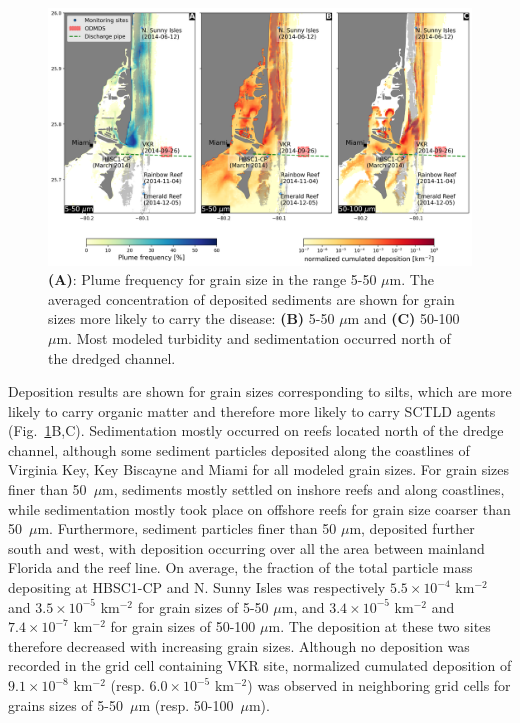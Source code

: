 \documentclass[preprint,12pt,authoryear]{elsarticle}
\begin{document}
\begin{figure}
	\centering
	\includegraphics[width=\textwidth]{figures/fig2_stokes4.png}
	\caption{\textbf{(A)}: Plume frequency for grain size in the range 5-50 $\mu$m. The averaged concentration of deposited sediments are shown for grain sizes more likely to carry the disease: \textbf{(B)} 5-50 $\mu$m and \textbf{(C)} 50-100 $\mu$m. Most modeled turbidity and sedimentation occurred north of the dredged channel.}
	\label{fig:onset_depo}
\end{figure}

Deposition results are shown for grain sizes corresponding to silts, which are more likely to carry organic matter and therefore more likely to carry SCTLD agents \citep{erftemeijer2012environmental}(Fig.~\ref{fig:onset_depo}B,C). Sedimentation mostly occurred on reefs located north of the dredge channel, although some sediment particles deposited along the coastlines of Virginia Key, Key Biscayne and Miami for all modeled grain sizes. For grain sizes finer than 50~$\mu$m, sediments mostly settled on inshore reefs and along coastlines, while sedimentation mostly took place on offshore reefs for grain size coarser than 50~$\mu$m. Furthermore, sediment particles finer than 50 $\mu$m, deposited further south and west, with deposition occurring over all the area between mainland Florida and the reef line. On average, the fraction of the total particle mass depositing at HBSC1-CP and N. Sunny Isles was respectively $5.5\times10^{-4}$ km$^{-2}$ and $3.5\times10^{-5}$ km$^{-2}$ for grain sizes of 5-50 $\mu$m, and  $3.4\times10^{-5}$ km$^{-2}$ and $7.4\times 10^{-7}$ km$^{-2}$ for grain sizes of 50-100 $\mu$m. The deposition at these two sites therefore decreased with increasing grain sizes. Although no deposition was recorded in the grid cell containing VKR site, normalized cumulated deposition of $9.1\times10^{-8}$ km$^{-2}$ (resp. $6.0\times10^{-5}$ km$^{-2}$) was observed in neighboring grid cells for grains sizes of 5-50~$\mu$m (resp. 50-100~$\mu$m).
\end{document}

